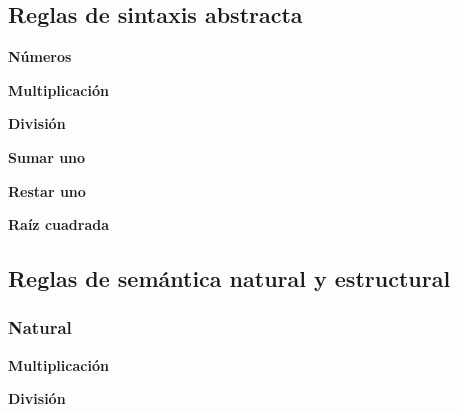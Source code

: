 \documentclass{article}
\begin{document}
\subsection*{Reglas de sintaxis abstracta}
\textbf{Números}
\begin{prooftree}
\end{prooftree}

\textbf{Multiplicación}
\begin{prooftree}
\end{prooftree}

\textbf{División}
\begin{prooftree}
\end{prooftree}

\textbf{Sumar uno}
\begin{prooftree}
\end{prooftree}

\textbf{Restar uno}
\begin{prooftree}
\end{prooftree}

\textbf{Raíz cuadrada}
\begin{prooftree}
\end{prooftree}

\subsection*{Reglas de semántica natural y estructural}
\subsubsection*{Natural}

\hspace{1cm} \textbf{Multiplicación}
\begin{prooftree}
\end{prooftree}

\hspace{1cm}  \textbf{División}
\begin{prooftree}
\end{prooftree}
\end{document}
